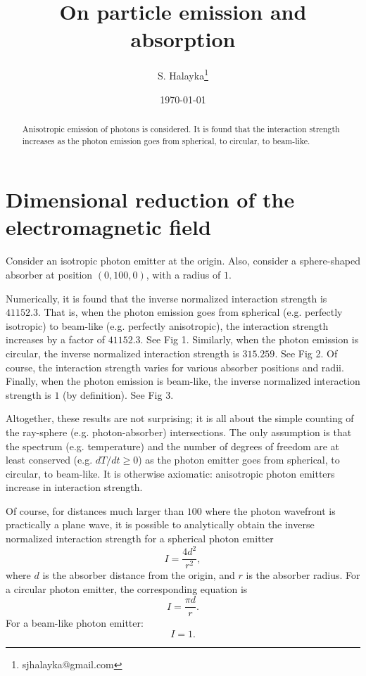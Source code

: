 \documentclass[12pt]{article}
\title{On particle emission and absorption}
\author{S. Halayka\footnote{sjhalayka@gmail.com}}
\date{\today}
\begin{document}
\maketitle

\begin{abstract}
Anisotropic emission of photons is considered.
It is found that the interaction strength increases as the photon emission goes from spherical, to circular, to beam-like.
\end{abstract}



\section{Dimensional reduction of the electromagnetic field}
Consider an isotropic photon emitter at the origin.
Also, consider a sphere-shaped absorber at position $(0, 100, 0)$, with a radius of $1$.

Numerically, it is found that the inverse normalized interaction strength is $41152.3$.
That is, when the photon emission goes from spherical (e.g. perfectly isotropic) to beam-like (e.g. perfectly anisotropic), the interaction strength increases by a factor of $41152.3$.
See Fig 1.
Similarly, when the photon emission is circular, the inverse normalized interaction strength is $315.259$.
See Fig 2.
Of course, the interaction strength varies for various absorber positions and radii.
Finally, when the photon emission is beam-like, the inverse normalized interaction strength is $1$ (by definition).
See Fig 3.

Altogether, these results are not surprising; it is all about the simple counting of the ray-sphere (e.g. photon-absorber) intersections. 
The only assumption is that the spectrum (e.g. temperature) and the number of degrees of freedom are at least conserved (e.g. $dT/dt \geq 0$) as the photon emitter goes from spherical, to circular, to beam-like.
It is otherwise axiomatic: anisotropic photon emitters increase in interaction strength.

Of course, for distances much larger than $100$ where the photon wavefront is practically a plane wave, it is possible to analytically obtain the inverse normalized interaction strength for a spherical photon emitter
\begin{equation}
I = \frac{4 d^2}{r^2},
\end{equation}
where $d$ is the absorber distance from the origin, and $r$ is the absorber radius.
For a circular photon emitter, the corresponding equation is
\begin{equation}
I = \frac{\pi d}{r}.
\end{equation}
For a beam-like photon emitter:
\begin{equation}
I = 1.
\end{equation}
\end{document}
